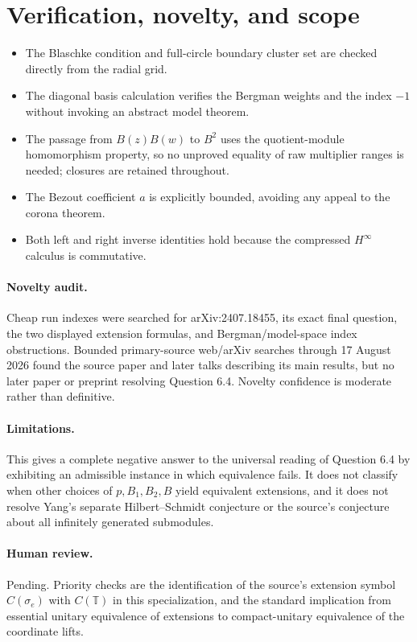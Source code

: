 \documentclass[11pt]{article}
\newcommand{\T}{\mathbb T}
\begin{document}
\section*{Verification, novelty, and scope}
\begin{itemize}
\item The Blaschke condition and full-circle boundary cluster set are
checked directly from the radial grid.
\item The diagonal basis calculation verifies the Bergman weights and the
index \(-1\) without invoking an abstract model theorem.
\item The passage from \(B(z)B(w)\) to \(B^2\) uses the quotient-module
homomorphism property, so no unproved equality of raw multiplier ranges is
needed; closures are retained throughout.
\item The Bezout coefficient \(a\) is explicitly bounded, avoiding any
appeal to the corona theorem.
\item Both left and right inverse identities hold because the compressed
\(H^\infty\) calculus is commutative.
\end{itemize}

\paragraph{Novelty audit.}
Cheap run indexes were searched for arXiv:2407.18455, its exact final
question, the two displayed extension formulas, and Bergman/model-space
index obstructions.  Bounded primary-source web/arXiv searches through 17
August 2026 found the source paper and later talks describing its main
results, but no later paper or preprint resolving Question 6.4.  Novelty
confidence is moderate rather than definitive.

\paragraph{Limitations.}
This gives a complete negative answer to the universal reading of Question
6.4 by exhibiting an admissible instance in which equivalence fails.  It
does not classify when other choices of \(p,B_1,B_2,B\) yield equivalent
extensions, and it does not resolve Yang's separate Hilbert--Schmidt
conjecture or the source's conjecture about all infinitely generated
submodules.

\paragraph{Human review.}
Pending.  Priority checks are the identification of the source's extension
symbol \(C(\sigma_e)\) with \(C(\T)\) in this specialization, and the
standard implication from essential unitary equivalence of extensions to
compact-unitary equivalence of the coordinate lifts.
\end{document}
